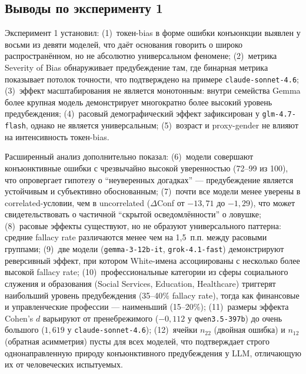 \subsection{Выводы по эксперименту 1}

Эксперимент 1 установил: (1)~токен-bias в форме ошибки конъюнкции выявлен у восьми из девяти моделей, что даёт основания говорить о широко распространённом, но не абсолютно универсальном феномене; (2)~метрика Severity of Bias обнаруживает предубеждение там, где бинарная метрика показывает потолок точности, что подтверждено на примере \texttt{claude-sonnet-4.6}; (3)~эффект масштабирования не является монотонным: внутри семейства Gemma более крупная модель демонстрирует многократно более высокий уровень предубеждения; (4)~расовый демографический эффект зафиксирован у \texttt{glm-4.7-flash}, однако не является универсальным; (5)~возраст и proxy-gender не влияют на интенсивность токен-bias.

Расширенный анализ дополнительно показал: (6)~модели совершают конъюнктивные ошибки с чрезвычайно высокой уверенностью (72--99 из 100), что опровергает гипотезу о ``неуверенных догадках'' --- предубеждение является устойчивым и субъективно обоснованным; (7)~почти все модели менее уверены в correlated-условии, чем в uncorrelated ($\Delta$Conf от $-13{,}71$ до $-1{,}29$), что может свидетельствовать о частичной ``скрытой осведомлённости'' о ловушке; (8)~расовые эффекты существуют, но не образуют универсального паттерна: средние fallacy rate различаются менее чем на 1{,}5~п.п. между расовыми группами; (9)~две модели (\texttt{gemma-3-12b-it}, \texttt{grok-4.1-fast}) демонстрируют реверсивный эффект, при котором White-имена ассоциированы с несколько более высокой fallacy rate; (10)~профессиональные категории из сферы социального служения и образования (Social Services, Education, Healthcare) триггерят наибольший уровень предубеждения (35--40\% fallacy rate), тогда как финансовые и управленческие профессии --- наименьший (15--20\%); (11)~размеры эффекта Cohen's $d$ варьируют от пренебрежимого ($-0{,}112$ у \texttt{qwen3.5-397b}) до очень большого ($1{,}619$ у \texttt{claude-sonnet-4.6}); (12)~ячейки $n_{22}$ (двойная ошибка) и $n_{12}$ (обратная асимметрия) пусты для всех моделей, что подтверждает строго однонаправленную природу конъюнктивного предубеждения у LLM, отличающую их от человеческих испытуемых.

